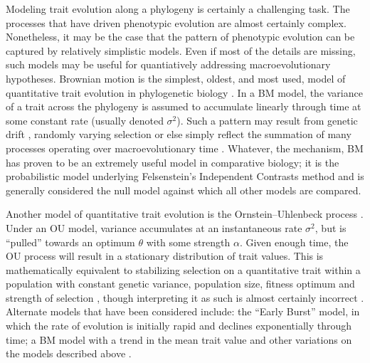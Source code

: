 \documentclass[a4paper,12pt]{article}
\begin{document}
Modeling trait evolution along a phylogeny is certainly a challenging task. The processes that have driven phenotypic evolution are almost certainly complex. Nonetheless, it may be the case that the pattern of phenotypic evolution can be captured by relatively simplistic models. Even if most of the details are missing, such models may be useful for quantiatively addressing macroevolutionary hypotheses. Brownian motion is the simplest, oldest, and most used, model of quantitative trait evolution in phylogenetic biology  \citep[BM;][]{Edwards1964, Felsenstein1973, Thompson1975}. In a BM model, the variance of a trait across the phylogeny is assumed to accumulate linearly through time at some constant rate (usually denoted $\sigma^2$). Such a pattern may result from genetic drift \citep{Lande1977, Felsenstein1988, Lynch1990, HansenMartins1996}, randomly varying selection \citep{Felsenstein1973, Felsenstein1988} or else simply reflect the summation of many processes operating over macroevolutionary time \citep{HansenMartins1996, Uyeda2011, PennellPE}. Whatever, the mechanism, BM has proven to be an extremely useful model in comparative biology; it is the probabilistic model underlying Felsenstein's Independent Contrasts method \citep[][see below]{Felsenstein1985} and is generally considered the null model against which all other models are compared. %
 
Another model of quantitative trait evolution is the Ornstein--Uhlenbeck process \citep[OU;][]{Felsenstein1988, Hansen1997}. Under an OU model, variance accumulates at an instantaneous rate $\sigma^2$, but is ``pulled'' towards an optimum $\theta$ with some strength $\alpha$. Given enough time, the OU process will result in a stationary distribution of trait values. This is mathematically equivalent to stabilizing selection on a quantitative trait within a population with constant genetic variance, population size, fitness optimum and strength of selection \citep{Lande1976}, though interpreting it as such is almost certainly incorrect \citep{HansenMartins1996}.  
Alternate models that have been considered include: the ``Early Burst'' \citep[EB;][]{Blomberg2003, Harmon2010, SlaterPennell} model, in which the rate of evolution is initially rapid and declines exponentially through time; a BM model with a trend in the mean trait value \citep{Hunt2006} and other variations on the models described above \citep[e.g.][]{Pagel1997, Pagel1999, ButlerKing2004, Omeara2006, Eastman2011, Beaulieu2012, SlaterMEE, Eastmanlevy}. 
\end{document}
